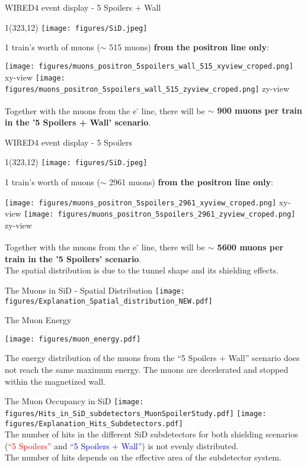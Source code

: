 \documentclass[xcolor={dvipsnames}]{beamer}
\newcommand{\sidlogo}{
  \setlength{\TPHorizModule}{1pt}
  \setlength{\TPVertModule}{1pt}
  \begin{textblock}{1}(323,12)
   \texttt{[image: figures/SiD.jpeg]}
  \end{textblock}
  }
\begin{document}
\begin{frame}{WIRED4 event display - 5 Spoilers + Wall}
\sidlogo
1 train's worth of muons ($\sim$ 515 muons) \textbf{from the positron line only}:
\begin{center}
\texttt{[image: figures/muons\_positron\_5spoilers\_wall\_515\_xyview\_croped.png]}
{\tiny xy-view}
\texttt{[image: figures/muons\_positron\_5spoilers\_wall\_515\_zyview\_croped.png]}
{\tiny zy-view}
\end{center}
Together with the muons from the e\textsuperscript{-} line, there will be \textbf{$\sim$ 900 muons per train in the '5 Spoilers + Wall' scenario}.
\end{frame}
\begin{frame}{WIRED4 event display - 5 Spoilers}
\sidlogo
1 train's worth of muons ($\sim$ 2961 muons) \textbf{from the positron line only}:
\begin{center}
\texttt{[image: figures/muons\_positron\_5spoilers\_2961\_xyview\_croped.png]}
{\tiny xy-view}
\texttt{[image: figures/muons\_positron\_5spoilers\_2961\_zyview\_croped.png]}
{\tiny zy-view}
\end{center}
Together with the muons from the e\textsuperscript{-} line, there will be \textbf{$\sim$ 5600 muons per train in the '5 Spoilers' scenario}.\\
The spatial distribution is due to the tunnel shape and its shielding effects.
\end{frame}
\begin{frame}{The Muons in SiD - Spatial Distribution}
 \texttt{[image: figures/Explanation\_Spatial\_distribution\_NEW.pdf]}
\end{frame}
\begin{frame}{The Muon Energy}
\begin{center}
  \texttt{[image: figures/muon\_energy.pdf]}
\end{center}
The energy distribution of the muons from the ``5 Spoilers + Wall'' scenario does not reach the same maximum energy. The muons are decelerated and stopped within the magnetized wall.
\end{frame}

\begin{frame}{The Muon Occupancy in SiD}
 \texttt{[image: figures/Hits\_in\_SiD\_subdetectors\_MuonSpoilerStudy.pdf]}
  \texttt{[image: figures/Explanation\_Hits\_Subdetectors.pdf]}\\
The number of hits in the different SiD subdetectors for both shielding scenarios (\textcolor{Red}{``5 Spoilers''} and \textcolor{Blue}{``5 Spoilers + Wall''}) is not evenly distributed.\\
The number of hits depends on the effective area of the subdetector system.
 \end{frame}
 
\end{document}
